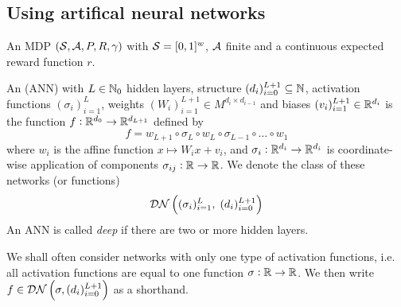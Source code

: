 \subsection{Using artifical neural networks}

\begin{sett}
  An MDP $(\mathcal{S}, \mathcal{A}, P, R, \gamma)$ with
  $\mathcal{S} = [0,1]^w$, $\mathcal{A}$ finite and
  a continuous expected reward function $r$.
  \label{sett:annApprox}
\end{sett}

\begin{defn}\label{def_ANN}
  An  (ANN) with $L \in \mathbb{N}_0$
  hidden layers, structure
  $(d_i)_{i=0}^{L+1} \subseteq \mathbb{N}$,
  activation functions $(\sigma_i)_{i=1}^L$,
  weights $(W_i)_{i=1}^{L+1} \in M^{d_i \times d_{i-1}}$ and
  biases $(v_i)_{i=1}^{L+1} \in \mathbb{R}^{d_i}$
  is the function $f:\mathbb{R}^{d_0} \to \mathbb{R}^{d_{L+1}}$ defined by
  \[ f = w_{L+1} \circ \sigma_L \circ w_L
  \circ \sigma_{L-1} \circ \dots \circ w_1 \]
  where $w_i$ is the affine function $x \mapsto W_i x + v_i$,
  and $\sigma_i : \mathbb{R}^{d_i} \to \mathbb{R}^{d_i}$ is coordinate-wise
  application of components $\sigma_{ij} : \mathbb{R} \to \mathbb{R}$.
  We denote the class of these networks (or functions)
  \[ \mathcal{DN} \left( (\sigma_i)_{i=1}^L,\; (d_i)_{i=0}^{L+1} \right) \]
  An ANN is called \emph{deep} if there are two or more hidden layers.
\end{defn}

We shall often consider networks with only one type of activation functions,
i.e. all activation functions are equal to one function $\sigma: \mathbb{R} \to \mathbb{R}$.
We then write $f \in \mathcal{DN}\left(\sigma, (d_i)_{i=0}^{L+1} \right)$ as a
shorthand.

